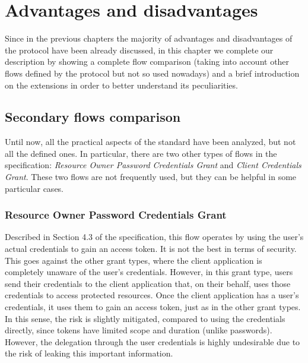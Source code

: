 
\chapter{Advantages and disadvantages}
Since in the previous chapters the majority of advantages and disadvantages of the protocol have been already discussed, in this chapter we complete our \textit{\oauth} description by showing a complete flow comparison (taking into account other flows defined by the protocol but not so used nowadays) and a brief introduction on the extensions in order to better understand its peculiarities. 

\minitoc

\section{Secondary flows comparison}
Until now, all the practical aspects of the standard  \cite{RFC6749} have been analyzed, but not all the defined ones. In particular, there are two other types of flows in the specification: \textit{Resource Owner Password Credentials Grant} and \textit{Client Credentials Grant}. These two flows are not frequently used, but they can be helpful in some particular cases.

\subsection{Resource Owner Password Credentials Grant}
Described in Section 4.3 of the specification, this flow operates by using the user's actual credentials to gain an access token. It is not the best in terms of security. This goes against the other grant types, where the client application is completely unaware of the user's credentials. However, in this grant type, users send their credentials to the client application that, on their behalf, uses those credentials to access protected resources.
Once the client application has a user's credentials, it uses them to gain an access token, just as in the other grant types. In this sense, the risk is slightly mitigated, compared to using the credentials directly, since tokens have limited scope and duration (unlike passwords). However, the delegation through the user credentials is highly undesirable due to the risk of leaking this important information.

